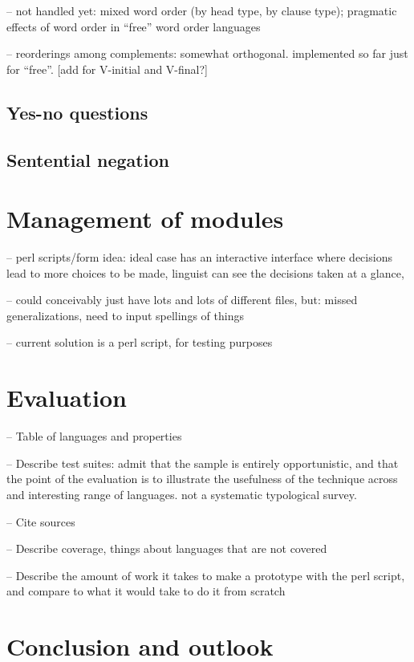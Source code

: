 \documentclass[11pt]{article}
\begin{document}
-- not handled yet: mixed word order (by head type, by clause type); pragmatic effects of word order in ``free'' word order languages

-- reorderings among complements: somewhat orthogonal. implemented so far just for ``free''.  [add for V-initial and V-final?]


\subsection{Yes-no questions}

\subsection{Sentential negation}

\section{Management of modules}
\label{management}

-- perl scripts/form idea: ideal case has an interactive interface
where decisions lead to more choices to be made, linguist can see
the decisions taken at a glance, 

-- could conceivably just have lots and lots of different files, but:
missed generalizations, need to input spellings of things

-- current solution is a perl script, for testing purposes

\section{Evaluation}

-- Table of languages and properties

-- Describe test suites: admit that the sample is entirely opportunistic,
and that the point of the evaluation is to illustrate the usefulness of the
technique across and interesting range of languages.  not a systematic 
typological survey.

-- Cite sources

-- Describe coverage, things about languages that are not covered

-- Describe the amount of work it takes to make a prototype with the
perl script, and compare to what it would take to do it from scratch

\section{Conclusion and outlook}
\end{document}
